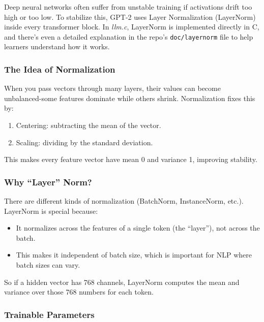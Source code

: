 \documentclass[
  letterpaper,
  DIV=11,
  numbers=noendperiod]{scrreprt}
\providecommand{\tightlist}{%
  \setlength{\itemsep}{0pt}\setlength{\parskip}{0pt}}
\begin{document}
Deep neural networks often suffer from unstable training if activations
drift too high or too low. To stabilize this, GPT-2 uses Layer
Normalization (LayerNorm) inside every transformer block. In
\emph{llm.c}, LayerNorm is implemented directly in C, and there's even a
detailed explanation in the repo's \texttt{doc/layernorm} file to help
learners understand how it works.

\subsubsection{The Idea of
Normalization}\label{the-idea-of-normalization}

When you pass vectors through many layers, their values can become
unbalanced-some features dominate while others shrink. Normalization
fixes this by:

\begin{enumerate}
\def\labelenumi{\arabic{enumi}.}
\tightlist
\item
  Centering: subtracting the mean of the vector.
\item
  Scaling: dividing by the standard deviation.
\end{enumerate}

This makes every feature vector have mean 0 and variance 1, improving
stability.

\subsubsection{Why ``Layer'' Norm?}\label{why-layer-norm}

There are different kinds of normalization (BatchNorm, InstanceNorm,
etc.). LayerNorm is special because:

\begin{itemize}
\tightlist
\item
  It normalizes across the features of a single token (the ``layer''),
  not across the batch.
\item
  This makes it independent of batch size, which is important for NLP
  where batch sizes can vary.
\end{itemize}

So if a hidden vector has 768 channels, LayerNorm computes the mean and
variance over those 768 numbers for each token.

\subsubsection{Trainable Parameters}\label{trainable-parameters}
\end{document}
